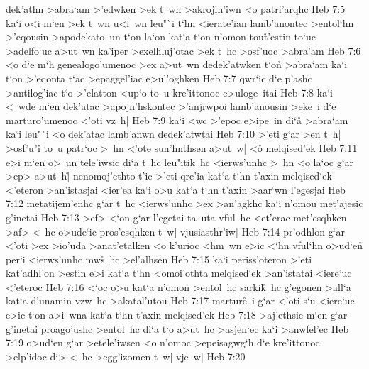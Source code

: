 dek'athn
>abra`am
>'edwken
>ek
t~wn
>akrojin'iwn
<o
patri'arqhc\bibvsend
\vs Heb 7:5
ka`i
o<i
m`en
>ek
t~wn
u<i~wn
leu"`i
t`hn
<ierate'ian
lamb'anontec
>entol`hn
>'eqousin
>apodekato~un
t`on
la`on
kat`a
t`on
n'omon
tou\r{t}'estin
to`uc
>adelfo`uc
a>ut~wn
ka'iper
>exelhluj'otac
>ek
t~hc
>osf'uoc
>abra'am\bibvsend
\vs Heb 7:6
<o
d`e
m`h
genealogo'umenoc
>ex
a>ut~wn
dedek'atwken
t`on\r{}
>abra`am
ka`i
t`on
>'eqonta
t`ac
>epaggel'iac
e>ul'oghken\bibvsend
\vs Heb 7:7
qwr`ic
d`e
p'ashc
>antilog'iac
t`o
>'elatton
<up`o
to~u
kre'ittonoc
e>uloge~itai\bibvsend
\vs Heb 7:8
ka`i
<~wde
m`en
dek'atac
>apojn'hskontec
>'anjrwpoi
lamb'anousin
>eke~i
d`e
marturo'umenoc
<'oti
vz~h|\bibvsend
\vs Heb 7:9
ka`i
<wc
>'epoc
e>ipe~in
di`a\r{}
>abra`am
ka`i
leu"`i
<o
dek'atac
lamb'anwn
dedek'atwtai\bibvsend
\vs Heb 7:10
>'eti
g`ar
>en
t~h|
>osf'u"i
to~u
patr`oc
>~hn
<'ote
sun'hnthsen
a>ut~w|
<o\r{}
melqised'ek\bibvsend
\vs Heb 7:11
e>i
m`en
o>~un
tele'iwsic
di`a
t~hc
leu"itik~hc
<ierws'unhc
>~hn
<o
la`oc
g`ar
>ep>
a>ut~h|\r{}
nenomoj'ethto
t'ic
>'eti
qre'ia
kat`a
t`hn
t'axin
melqised`ek
<'eteron
>an'istasjai
<ier'ea
ka`i
o>u
kat`a
t`hn
t'axin
>aar`wn
l'egesjai\bibvsend
\vs Heb 7:12
metatijem'enhc
g`ar
t~hc
<ierws'unhc
>ex
>an'agkhc
ka`i
n'omou
met'ajesic
g'inetai\bibvsend
\vs Heb 7:13
>ef>
<`on
g`ar
l'egetai
ta~uta
vful~hc
<et'erac
met'esqhken
>af>
<~hc
o>ude`ic
pros'esqhken
t~w|
vjusiasthr'iw|\bibvsend
\vs Heb 7:14
pr'odhlon
g`ar
<'oti
>ex
>io'uda
>anat'etalken
<o
k'urioc
<hm~wn
e>ic
<`hn
vful`hn
o>ud`en\r{}
per`i
<ierws'unhc
mw\r{s}~hc
>el'alhsen\bibvsend
\vs Heb 7:15
ka`i
periss'oteron
>'eti
kat'adhl'on
>estin
e>i
kat`a
t`hn
<omoi'othta
melqised`ek
>an'istatai
<iere`uc
<'eteroc\bibvsend
\vs Heb 7:16
<`oc
o>u
kat`a
n'omon
>entol~hc
sarki\r{k}~hc
g'egonen
>all`a
kat`a
d'unamin
vzw~hc
>akatal'utou\bibvsend
\vs Heb 7:17
martur\r{e}~i
g`ar
<'oti
s`u
<iere`uc
e>ic
t`on
a>i~wna
kat`a
t`hn
t'axin
melqised'ek\bibvsend
\vs Heb 7:18
>aj'ethsic
m`en
g`ar
g'inetai
proago'ushc
>entol~hc
di`a
t`o
a>ut~hc
>asjen`ec
ka`i
>anwfel'ec\bibvsend
\vs Heb 7:19
o>ud`en
g`ar
>etele'iwsen
<o
n'omoc
>epeisagwg`h
d`e
kre'ittonoc
>elp'idoc
di>
<~hc
>egg'izomen
t~w|
vje~w|\bibvsend
\vs Heb 7:20
